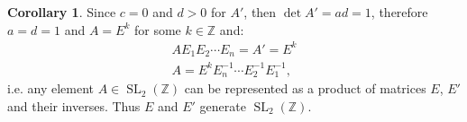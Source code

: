 \documentclass{article}
\theoremstyle{definition}
\newtheorem*{corollary}{Corollary}
\newcommand{\Z}{\mathbb{Z}}
\newcommand{\SL}{\operatorname{SL}}
\begin{document}
\begin{corollary}
Since $c = 0$ and $d > 0$ for $A'$, then $\det A' = ad = 1$, therefore $a=d=1$ and $A = E^k$ for some $k \in \Z$ and:
\begin{gather*}
    A E_1 E_2 \cdots E_n  = A' = E^k \\
    A = E^k E_n^{-1} \cdots E_2^{-1} E_1^{-1},
\end{gather*}
i.e. any element $A \in \SL_2(\Z)$ can be represented as a product of matrices $E$, $E'$ and their inverses. Thus $E$ and $E'$ generate $\SL_2(\Z)$.
\end{corollary}
\end{document}
